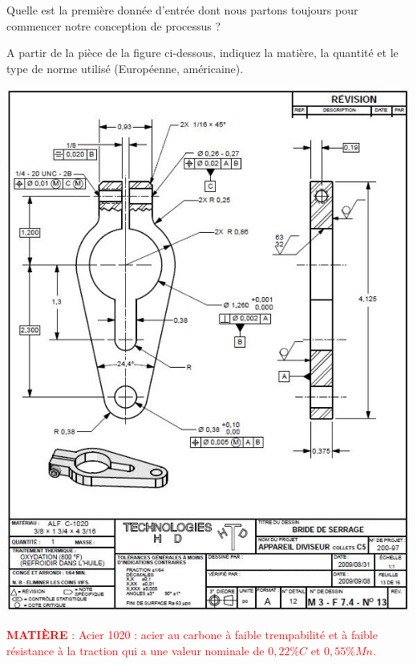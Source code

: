 \documentclass[12pt,a4paper]{article} %
\begin{document}
\begin{exo} Quelle est la première donnée d'entrée dont nous partons toujours pour commencer notre conception de processus ?\end{exo} 





\newpage  %

\begin{exo} A partir de la pièce de la figure ci-dessous, indiquez la matière, la quantité et le type de norme utilisé (Européenne, américaine).\end{exo}  
\begin{center}
\includegraphics[scale=0.75]{dessin1.JPG}
\end{center}
\textcolor{red}{\textbf{MATIÈRE} : Acier 1020 : acier au carbone à faible trempabilité et à faible résistance à la traction qui a une valeur nominale de $0,22\%C$ et $0,55\%Mn$.} \\
\end{document}
